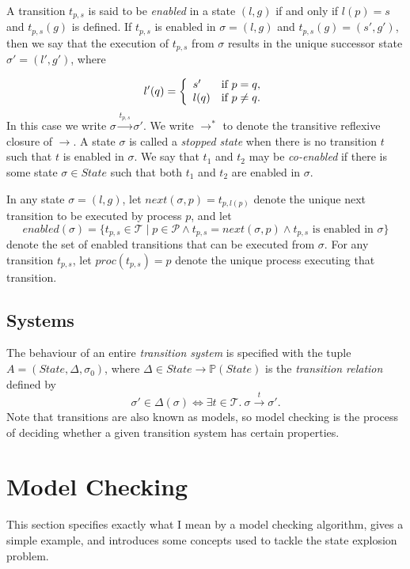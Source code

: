 \documentclass[12pt,a4paper,twoside,openright]{report}
\begin{document}
A transition $t_{p,s}$ is said to be \emph{enabled} in a state
$(l, g)$ if and only if $l(p) = s$ and $t_{p,s}(g)$ is defined.
If $t_{p,s}$ is enabled in $\sigma = (l, g)$ and 
$t_{p,s}(g) = (s', g')$, then we say that the
execution of $t_{p,s}$ from $\sigma$ results in the unique successor
state $\sigma' = (l', g')$, where

\[
	l'(q) = \left\{\begin{array}{lr}
				s' & \textmd{if } p = q, \\
				l(q) &\textmd{if } p \neq q.
			\end{array} \right.
\]
In this case we write $\sigma \xrightarrow{t_{p,s}} \sigma'$.
We write $\longrightarrow^*$ to denote the transitive reflexive
closure of $\longrightarrow$.
A state $\sigma$ is called a \emph{stopped state} when there is no transition
$t$ such that $t$ is enabled in $\sigma$. We say that $t_1$ and $t_2$
may be \emph{co-enabled} if there is some state $\sigma \in \textit{State}$
such that both $t_1$ and $t_2$ are enabled in $\sigma$.

In any state $\sigma = (l, g)$, let
$\textit{next}(\sigma, p) = t_{p,l(p)}$ denote the unique next transition
to be executed by process $p$, and let
\[
	\textit{enabled}(\sigma) = \{t_{p,s} \in \mathcal{T} \mid
	p \in \mathcal{P} \wedge t_{p,s} = \textit{next}(\sigma, p)
	\wedge t_{p,s} \text{ is enabled in } \sigma\}
\]
denote the set of enabled transitions that can be executed from $\sigma$.
For any transition $t_{p,s}$, let $\textit{proc}(t_{p,s}) = p$
denote the unique process executing that transition.

\subsection{Systems}
The behaviour of an entire \emph{transition system} is
specified with the tuple $A = (\textit{State}, \Delta, \sigma_0)$,
where $\Delta \in State \to \mathbb{P}(State)$
is the \emph{transition relation} defined by
\[
	\sigma' \in \Delta(\sigma) \iff
	\exists t \in \mathcal{T}. \ \sigma \xrightarrow{t} \sigma'.
\]
Note that transitions are also known as models,
so model checking is the process of deciding
whether a given transition system has certain
properties.

\section{Model Checking}
This section specifies exactly what I mean by
a model checking algorithm, gives a simple
example, and introduces some concepts used
to tackle the state explosion problem.
\end{document}
